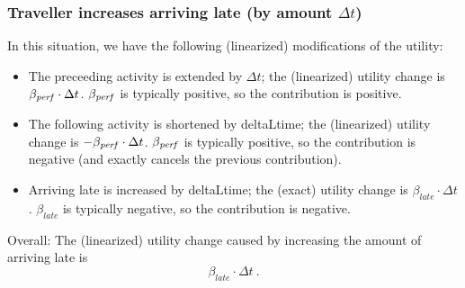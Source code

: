 \subsubsection{Traveller increases arriving late (by amount $\Delta t$)}

In this situation, we have the following (linearized) modifications of the utility:
\begin{itemize}

\item The preceeding activity is extended by $\Delta t$; the
(linearized) utility change is $\beta_{\it perf} \cdot \Delta
t$. $\beta_{\it perf}$ is typically positive, so the contribution is
positive.

\item The following activity is shortened by deltaLtime; the (linearized)  utility change is $- \beta_{\it perf} \cdot \Delta t$. $\beta_{\it perf}$ is  typically positive, so the contribution is negative (and exactly cancels  the previous contribution).

\item Arriving late is increased by deltaLtime; the (exact) utility change  is $\beta_{late} \cdot \Delta t$. $\beta_{late}$ is typically negative, so  the contribution is negative.

\end{itemize}

Overall: The (linearized) utility change caused by increasing the amount of arriving late is
\[
\beta_{late} \cdot \Delta t \ .
\]



